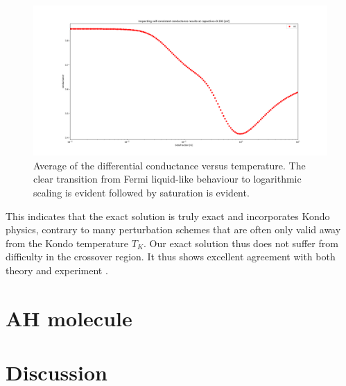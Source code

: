 \documentclass{article}
\begin{document}
\begin{multicols}{2}
        \begin{figure}[b]
            \centering
            \includegraphics[width=\textwidth]{zeroBiasConductanceLog}
            \caption{\label{fig:conductance} Average of the differential conductance versus temperature. The clear transition from Fermi liquid-like behaviour to logarithmic scaling is evident followed by saturation is evident.}
        \end{figure}
        
        This indicates that the exact solution is truly exact and incorporates Kondo physics, contrary to many perturbation schemes that are often only valid away from the Kondo temperature $T_K$. Our exact solution thus does not suffer from difficulty in the crossover region. It thus shows excellent agreement with both theory and experiment \cite{Sasaki2000}.
        
        
        
    \section{AH molecule}\label{sec:ahmolecule}
    \section{Discussion}\label{sec:discussion}
     
\end{multicols}
\end{document}
